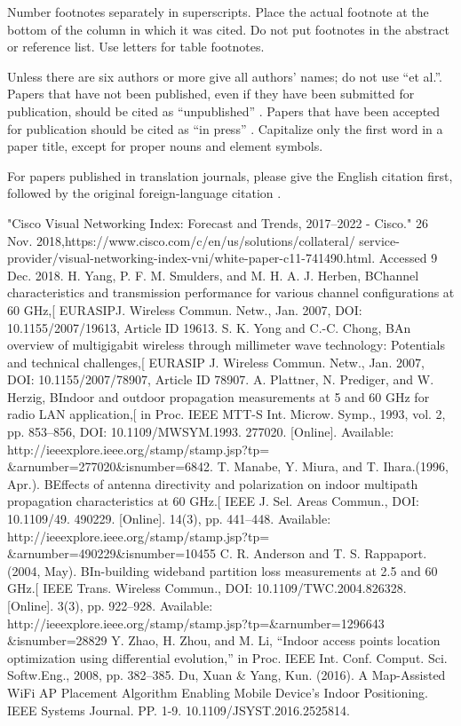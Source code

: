 \documentclass[conference]{IEEEtran}
\begin{document}
Number footnotes separately in superscripts. Place the actual footnote at 
the bottom of the column in which it was cited. Do not put footnotes in the 
abstract or reference list. Use letters for table footnotes.

Unless there are six authors or more give all authors' names; do not use 
``et al.''. Papers that have not been published, even if they have been 
submitted for publication, should be cited as ``unpublished'' \cite{b4}. Papers 
that have been accepted for publication should be cited as ``in press'' \cite{b5}. 
Capitalize only the first word in a paper title, except for proper nouns and 
element symbols.

For papers published in translation journals, please give the English 
citation first, followed by the original foreign-language citation \cite{b6}.

\begin{thebibliography}{00}
  "Cisco Visual Networking Index: Forecast and Trends, 2017–2022 - Cisco." 26 Nov. 2018,https://www.cisco.com/c/en/us/solutions/collateral/
service-provider/visual-networking-index-vni/white-paper-c11-741490.html. Accessed 9 Dec. 2018.
 H. Yang, P. F. M. Smulders, and M. H. A. J. Herben, BChannel characteristics and transmission performance for various channel configurations at 60 GHz,[ EURASIPJ. Wireless Commun. Netw., Jan. 2007, DOI: 10.1155/2007/19613, Article ID 19613.
 S. K. Yong and C.-C. Chong, BAn overview of multigigabit wireless through millimeter wave technology: Potentials and technical challenges,[ EURASIP J. Wireless Commun. Netw., Jan. 2007, DOI: 10.1155/2007/78907,
Article ID 78907.
 A. Plattner, N. Prediger, and W. Herzig, BIndoor and outdoor propagation measurements at 5 and 60 GHz for radio LAN application,[ in Proc. IEEE MTT-S Int. Microw. Symp., 1993, vol. 2, pp. 853–856, DOI: 10.1109/MWSYM.1993. 277020. [Online]. Available: http://ieeexplore.ieee.org/stamp/stamp.jsp?tp=
\&arnumber=277020\&isnumber=6842.
 T. Manabe, Y. Miura, and T. Ihara.(1996, Apr.). BEffects of antenna directivity and polarization on indoor multipath propagation characteristics at 60 GHz.[ IEEE J. Sel. Areas Commun., DOI: 10.1109/49. 490229. [Online]. 14(3), pp. 441–448. Available: http://ieeexplore.ieee.org/stamp/stamp.jsp?tp=
\&arnumber=490229\&isnumber=10455
 C. R. Anderson and T. S. Rappaport. (2004, May). BIn-building wideband partition loss measurements at 2.5 and 60 GHz.[ IEEE Trans. Wireless Commun., DOI: 10.1109/TWC.2004.826328. [Online]. 3(3), pp. 922–928. Available: http://ieeexplore.ieee.org/stamp/stamp.jsp?tp=\&arnumber=1296643
\&isnumber=28829
 Y. Zhao, H. Zhou, and M. Li, “Indoor access points location optimization using differential evolution,” in Proc. IEEE Int. Conf. Comput. Sci. Softw.Eng., 2008, pp. 382–385.
 Du, Xuan \& Yang, Kun. (2016). A Map-Assisted WiFi AP Placement Algorithm Enabling Mobile Device’s Indoor Positioning. IEEE Systems Journal. PP. 1-9. 10.1109/JSYST.2016.2525814. 
\end{thebibliography}
\end{document}
